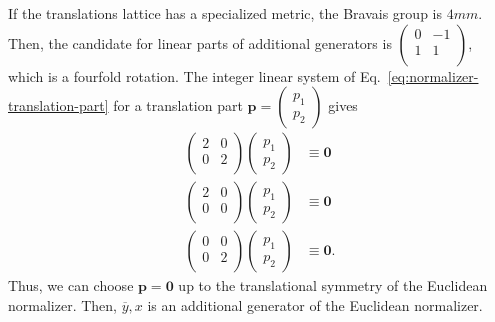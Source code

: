 If the translations lattice has a specialized metric, the Bravais group is $4mm$.
Then, the candidate for linear parts of additional generators is $\begin{pmatrix} 0 & -1 \\ 1 & 1 \\ \end{pmatrix}$, which is a fourfold rotation.
The integer linear system of Eq.~\eqref{eq:normalizer-translation-part} for a translation part $\bm{p} = \begin{pmatrix} p_{1} \\ p_{2} \end{pmatrix}$ gives
\begin{align*}
  \begin{pmatrix}
    2 & 0 \\
    0 & 2 \\
  \end{pmatrix}
  \begin{pmatrix} p_{1} \\ p_{2} \end{pmatrix}
  &\equiv \bm{0} \\
  \begin{pmatrix}
    2 & 0 \\
    0 & 0 \\
  \end{pmatrix}
  \begin{pmatrix} p_{1} \\ p_{2} \end{pmatrix}
  &\equiv \bm{0} \\
  \begin{pmatrix}
    0 & 0 \\
    0 & 2 \\
  \end{pmatrix}
  \begin{pmatrix} p_{1} \\ p_{2} \end{pmatrix}
  &\equiv \bm{0}.
\end{align*}
Thus, we can choose $\bm{p} = \bm{0}$ up to the translational symmetry of the Euclidean normalizer.
Then, $\overline{y},x$ is an additional generator of the Euclidean normalizer.
